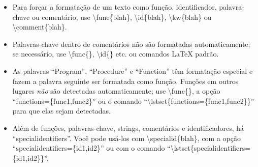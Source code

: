 \begin{itemize}
    \item Para forçar a formatação de um texto como função, identificador,
          palavra-chave ou comentário, use \textsf{\textbackslash{}func\{blah\}},
          \textsf{\textbackslash{}id\{blah\}}, \textsf{\textbackslash{}kw\{blah\}} ou
          \textsf{\textbackslash{}comment\{blah\}}.

    \item Palavras-chave dentro de comentários não são formatadas
          automaticamente; se necessário, use \textsf{\textbackslash{}func\{\}},
          \textsf{\textbackslash{}id\{\}} etc. ou comandos \LaTeX{} padrão.

    \item As palavras ``Program'', ``Procedure'' e ``Function'' têm formatação
          especial e fazem a palavra seguinte ser formatada como função.
          Funções em outros lugares \emph{não} são detectadas automaticamente;
          use \textsf{\textbackslash{}func\{\}}, a opção ``\textsf{functions=\{func1,func2\}}''
          ou o comando ``\textsf{\textbackslash{}lstset\{functions=\{func1,func2\}\}}''
          para que elas sejam detectadas.

    \item Além de funções, palavras-chave, strings, comentários e
          identificadores, há ``\textsf{specialidentifiers}''. Você pode
          usá-los com \textsf{\textbackslash{}specialid\{blah\}}, com a opção
          ``\textsf{specialidentifiers=\{id1,id2\}}'' ou com o comando
          ``\textsf{\textbackslash{}lstset\{specialidentifiers=\{id1,id2\}\}}''.

\end{itemize}


